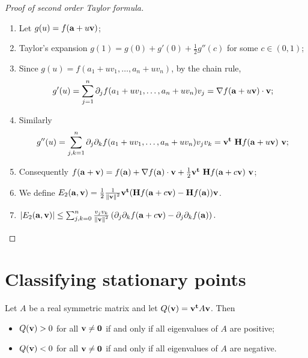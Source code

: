 \begin{proof}[Proof of second order Taylor formula]

    \begin{enumerate}
        \item Let \(g(u) = f(\mathbf{a} + u \mathbf{v})\);
        \item Taylor's expansion \(g(1) = g(0) + g'(0) + \frac{1}{2} g''(c)\) for some \(c\in (0,1)\);
        \item Since \(g(u) = f(a_1 + uv_1, \ldots, a_n + u v_n)\), by the chain rule,
              \[
                  g'(u) = \sum_{j=1}^{n} \partial_j f( a_1 + uv_1, \ldots, a_n + u v_n ) v_j
                  =\nabla f( \mathbf{a} + u \mathbf{v}) \cdot \mathbf{v};
              \]
              \vspace{-2em}
        \item Similarly
              \vspace{-1em}
              \[
                  g''(u) = \sum_{j,k=1}^{n} \partial_j\partial_k f( a_1 + uv_1, \ldots, a_n + u v_n ) v_j v_k
                  =  \vv^{\mathbf{t}} \ \mathbf{H} f (\aa + u \vv) \ \vv;
              \]
              \vspace{-1em}
        \item Consequently
              \(
              f(\mathbf{a}+\mathbf{v}) = f(\mathbf{a}) + \nabla f(\mathbf{a}) \cdot \mathbf{v} + \frac{1}{2} \mathbf{v}^{\mathbf{t}} \ \mathbf{H} f (\mathbf{a} + c\mathbf{v}) \ \mathbf{v}
              \);
        \item We define \(E_2(\mathbf{a},\mathbf{v}) = \frac{1}{2} \frac{1}{\left\|\mathbf{v}\right\|^2} \mathbf{v}^{\mathbf{t}} (\mathbf{H} f (\mathbf{a} + c\mathbf{v}) - \mathbf{H} f (\mathbf{a})  ) \mathbf{v}\).
        \item \(\left|E_2(\mathbf{a},\mathbf{v})\right| \leq \sum_{j,k=0}^{n}
              \frac{v_j v_k}{\left\|\mathbf{v}\right\|^2} \left( \partial_{j}\partial_{k}f(\mathbf{a}+c\mathbf{v})-\partial_{j}\partial_{k}f(\mathbf{a}) \right).\)
              \qedhere
    \end{enumerate}
\end{proof}


\section{Classifying stationary points}

\begin{theorem}
    Let \(A\) be a real symmetric matrix and let
    \(Q(\mathbf{v}) =  \mathbf{v}^{\mathbf{t}} A  \mathbf{v}  \).
    Then
    \begin{itemize}
        \item \(Q(\mathbf{v}) > 0\) for all \(\mathbf{v} \neq \mathbf{0}\) if and only if all eigenvalues of \(A\) are positive;
        \item \(Q(\mathbf{v}) < 0\) for all \(\mathbf{v} \neq \mathbf{0}\) if and only if all eigenvalues of \(A\) are negative.
    \end{itemize}
\end{theorem}

